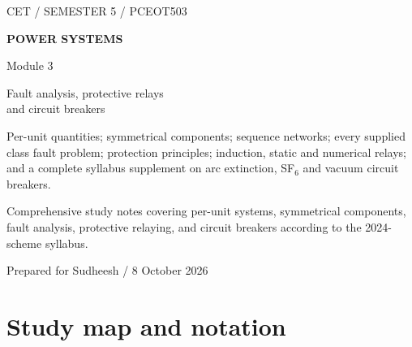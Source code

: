 \documentclass[11pt,a4paper]{article}
\newenvironment{Idea}[1]{\begin{tcolorbox}[colback=pale,colframe=teal,coltitle=white,title={#1}]}{\end{tcolorbox}}
\newcommand{\chapterstart}[2]{\clearpage\section{#1}\label{#2}}
\begin{document}
\begin{titlepage}
\vspace*{12mm}
{\small\sffamily\color{teal}CET / SEMESTER 5 / PCEOT503}\par\vspace{16mm}
{\Huge\sffamily\bfseries\color{ink}POWER SYSTEMS}\par\vspace{6mm}
{\huge\sffamily\color{teal}Module 3}\par\vspace{10mm}
{\LARGE\sffamily Fault analysis, protective relays\\and circuit breakers}\par\vspace{14mm}
\par\vspace{14mm}
\begin{Idea}{Learn the calculation and the physical response together}
Per-unit quantities; symmetrical components; sequence networks; every supplied class fault problem; protection principles; induction, static and numerical relays; and a complete syllabus supplement on arc extinction, SF$_6$ and vacuum circuit breakers.
\end{Idea}
\vfill
{\small Comprehensive study notes covering per-unit systems, symmetrical components, fault analysis, protective relaying, and circuit breakers according to the 2024-scheme syllabus.}\par\vspace{4mm}
{\small\sffamily Prepared for Sudheesh / 8 October 2026}
\end{titlepage}
\tableofcontents\clearpage{}

\chapterstart{Study map and notation}{map}
\end{document}
